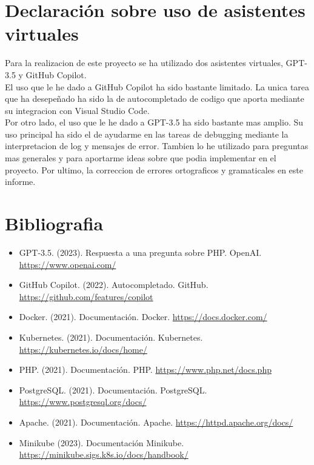 \documentclass{report}
\begin{document}
    \chapter{Declaración sobre uso de asistentes virtuales}
        Para la realizacion de este proyecto se ha utilizado dos asistentes virtuales, GPT-3.5 y GitHub Copilot.\\

        El uso que le he dado a GitHub Copilot ha sido bastante limitado.
        La unica tarea que ha desepeñado ha sido la de autocompletado de codigo que aporta mediante su integracion con Visual Studio Code.\\

        Por otro lado, el uso que le he dado a GPT-3.5 ha sido bastante mas amplio.
        Su uso principal ha sido el de ayudarme en las tareas de debugging mediante la interpretacion de log y mensajes de error.
        Tambien lo he utilizado para preguntas mas generales y para aportarme ideas sobre que podia implementar en el proyecto.
        Por ultimo, la correccion de errores ortograficos y gramaticales en este informe.\\
    \chapter{Bibliografia}
        \begin{itemize}
            \item GPT-3.5. (2023). Respuesta a una pregunta sobre PHP. OpenAI. \url{https://www.openai.com/}
            \item GitHub Copilot. (2022). Autocompletado. GitHub. \url{https://github.com/features/copilot}
            \item Docker. (2021). Documentación. Docker. \url{https://docs.docker.com/}
            \item Kubernetes. (2021). Documentación. Kubernetes. \url{https://kubernetes.io/docs/home/}
            \item PHP. (2021). Documentación. PHP. \url{https://www.php.net/docs.php}
            \item PostgreSQL. (2021). Documentación. PostgreSQL. \url{https://www.postgresql.org/docs/}
            \item Apache. (2021). Documentación. Apache. \url{https://httpd.apache.org/docs/}
            \item Minikube (2023). Documentación Minikube. \url{https://minikube.sigs.k8s.io/docs/handbook/}
        \end{itemize}
\end{document}
